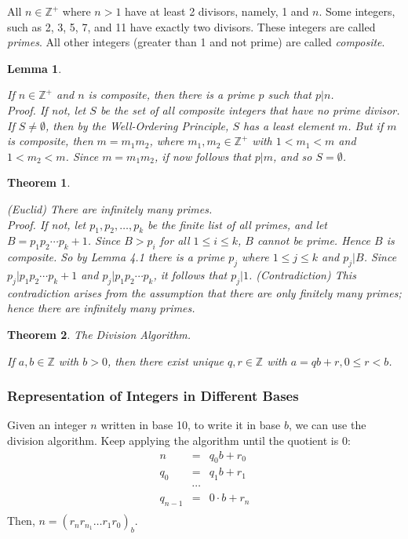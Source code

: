 \documentclass[12pt]{article}
\newtheorem{theorem}{Theorem} [section]
\newtheorem{lemma}{Lemma} [section]
\begin{document}
All $n \in \mathbb{Z}^+$ where $n > 1$ have at least 2 divisors, namely, 1 and $n$. Some integers, such as 2, 3, 5, 7, and 11 have exactly two divisors. These integers are called \emph{primes}. All other integers (greater than 1 and not prime) are called \emph{composite}.
\begin{lemma}
\begin{em}
If $n \in \mathbb{Z}^+$ and $n$ is composite, then there is a prime $p$ such that $p|n$.
\\
\emph{Proof.} If not, let $S$ be the set of all composite integers that have no prime divisor. If $S \neq \emptyset$, then by the Well-Ordering Principle, $S$ has a least element $m$. But if $m$ is composite, then $m = m_1m_2$, where $m_1, m_2 \in \mathbb{Z}^+$ with $1 < m_1 < m$ and $1 < m_2 < m$. Since $m = m_1m_2$, if now follows that $p|m$, and so $S = \emptyset$.
\end{em}
\end{lemma}
\begin{theorem}
\begin{em}
(Euclid) There are infinitely many primes.\\
\emph{Proof.} If not, let $p_1, p_2, \dots , p_k$ be the finite list of all primes, and let $B = p_1p_2\cdots p_k + 1$. Since $B > p_i$ for all $1 \leq i \leq k$, $B$ cannot be prime. Hence $B$ is composite. So by Lemma 4.1 there is a prime $p_j$ where $1 \leq j \leq k$ and $p_j|B$. Since $p_j|p_1p_2\cdots p_k+1$ and $p_j|p_1p_2\cdots p_k$, it follows that $p_j|1$. (Contradiction) This contradiction arises from the assumption that there are only finitely many primes; hence there are infinitely many primes.
\end{em}
\end{theorem}
\begin{theorem}
The Division Algorithm.
\begin{em}
If $a, b \in \mathbb{Z}$ with $b > 0$, then there exist unique $q, r \in \mathbb{Z}$ with $a = qb + r, 0 \leq r < b$.
\end{em}
\end{theorem}
\subsubsection{Representation of Integers in Different Bases}
Given an integer $n$ written in base 10, to write it in base $b$, we can use the division algorithm. Keep applying the algorithm until the quotient is 0:
\begin{eqnarray*}
n &=& q_0b + r_0\\
q_0 &=& q_1b + r_1\\
&\cdots&\\
q_{n-1} &=& 0 \cdot b + r_n\\
\end{eqnarray*}
Then, $n = (r_nr_{n_1}\dots r_1r_0)_b$.
\end{document}
